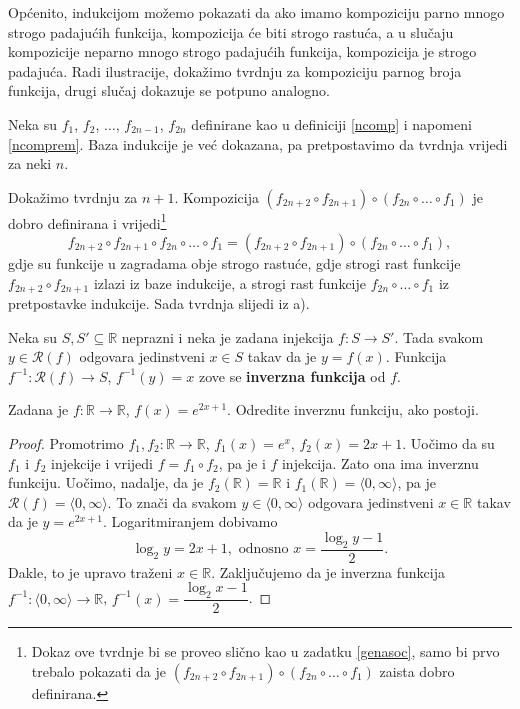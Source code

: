 \begin{remark}
Općenito, indukcijom možemo pokazati da ako imamo kompoziciju parno mnogo strogo padajućih funkcija, kompozicija će biti strogo rastuća, a u slučaju kompozicije neparno mnogo strogo padajućih funkcija, kompozicija je strogo padajuća. Radi ilustracije, dokažimo tvrdnju za kompoziciju parnog broja funkcija, drugi slučaj dokazuje se potpuno analogno. 

Neka su $f_1$, $f_2$, $\dots$, $f_{2n-1}$, $f_{2n}$ definirane kao u definiciji \ref{ncomp} i napomeni \ref{ncomprem}. Baza indukcije je već dokazana, pa pretpostavimo da tvrdnja vrijedi za neki $n$. 

Dokažimo tvrdnju za $n+1$. Kompozicija $(f_{2n+2}\circ f_{2n+1})\circ(f_{2n}\circ \dots \circ f_1)$ je dobro definirana i vrijedi\footnote{Dokaz ove tvrdnje bi se proveo slično kao u zadatku \ref{genasoc}, samo bi prvo trebalo pokazati da je $(f_{2n+2}\circ f_{2n+1})\circ(f_{2n}\circ \dots \circ f_1)$ zaista dobro definirana.}
$$f_{2n+2}\circ f_{2n+1}\circ f_{2n}\circ \dots \circ f_{1}=(f_{2n+2}\circ f_{2n+1})\circ (f_{2n}\circ \dots \circ f_{1}),$$ gdje su funkcije u zagradama obje strogo rastuće, gdje strogi rast funkcije $f_{2n+2}\circ f_{2n+1}$ izlazi iz baze indukcije, a strogi rast funkcije $f_{2n}\circ \dots \circ f_{1}$ iz pretpostavke indukcije. Sada tvrdnja slijedi iz a).
\end{remark}
\begin{definition}
Neka su $S, S'\subseteq \mathbb{R}$ neprazni i neka je zadana injekcija $f : S\to S'$. Tada svakom $y\in \mathcal{R}(f)$ odgovara jedinstveni $x\in S$ takav da je $y=f(x)$. Funkcija $f^{-1} : \mathcal{R}(f)\to S$, $f^{-1}(y)=x$ zove se \textbf{inverzna funkcija} od $f$.
\end{definition}
\begin{exercise}
\label{inv1}
Zadana je $f : \mathbb{R}\to \mathbb{R}$, $f(x)=e^{2x+1}$. Odredite inverznu funkciju, ako postoji.
\end{exercise}
\begin{proof}
Promotrimo $f_1, f_2 : \mathbb{R}\to \mathbb{R}$, $f_1(x)=e^x$, $f_2(x)=2x+1$. Uočimo da su $f_1$ i $f_2$ injekcije i vrijedi $f=f_1\circ f_2$, pa je i $f$ injekcija. Zato ona ima inverznu funkciju. Uočimo, nadalje, da je $f_2(\mathbb{R})=\mathbb{R}$ i $f_1(\mathbb{R})=\langle 0, \infty\rangle$, pa je $\mathcal{R}(f)=\langle 0, \infty\rangle$. To znači da svakom $y\in \langle 0, \infty\rangle$ odgovara jedinstveni $x\in \mathbb{R}$ takav da je $y=e^{2x+1}$. Logaritmiranjem dobivamo
$$\log_2{y}=2x+1,\text{ odnosno } x=\dfrac{\log_2{y}-1}{2}.$$
Dakle, to je upravo traženi $x\in \mathbb{R}$. Zaključujemo da je inverzna funkcija $f^{-1} : \langle 0, \infty\rangle \to \mathbb{R}$, $f^{-1}(x)=\dfrac{\log_2{x}-1}{2}$.
\end{proof}
